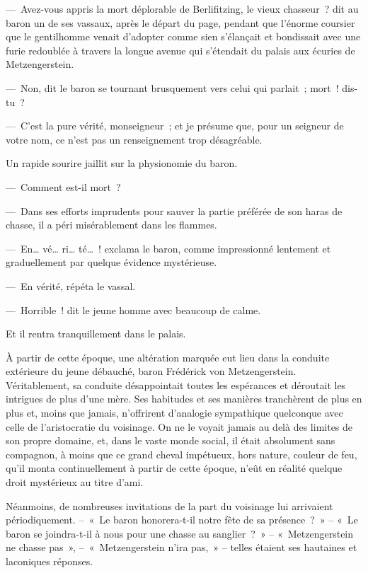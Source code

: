 \documentclass[french,twoside]{book} %
\begin{document}
— Avez-vous appris la mort déplorable de Berlifitzing, le vieux chasseur ? dit au baron un de ses vassaux, après le départ du page, pendant que l’énorme coursier que le gentilhomme venait d’adopter comme sien s’élançait et bondissait avec une furie redoublée à travers la longue avenue qui s’étendait du palais aux écuries de Metzengerstein.\par
— Non, dit le baron se tournant brusquement vers celui qui parlait ; mort ! dis-tu ?\par
— C’est la pure vérité, monseigneur ; et je présume que, pour un seigneur de votre nom, ce n’est pas un renseignement trop désagréable.\par
Un rapide sourire jaillit sur la physionomie du baron.\par
— Comment est-il mort ?\par
— Dans ses efforts imprudents pour sauver la partie préférée de son haras de chasse, il a péri misérablement dans les flammes.\par
— En… vé… ri… té… ! exclama le baron, comme impressionné lentement et graduellement par quelque évidence mystérieuse.\par
— En vérité, répéta le vassal.\par
— Horrible ! dit le jeune homme avec beaucoup de calme.\par
Et il rentra tranquillement dans le palais.\par
À partir de cette époque, une altération marquée eut lieu dans la conduite extérieure du jeune débauché, baron Frédérick von Metzengerstein. Véritablement, sa conduite désappointait toutes les espérances et déroutait les intrigues de plus d’une mère. Ses habitudes et ses manières tranchèrent de plus en plus et, moins que jamais, n’offrirent d’analogie sympathique quelconque avec celle de l’aristocratie du voisinage. On ne le voyait jamais au delà des limites de son propre domaine, et, dans le vaste monde social, il était absolument sans compagnon, à moins que ce grand cheval impétueux, hors nature, couleur de feu, qu’il monta continuellement à partir de cette époque, n’eût en réalité quelque droit mystérieux au titre d’ami.\par
Néanmoins, de nombreuses invitations de la part du voisinage lui arrivaient périodiquement. – « Le baron honorera-t-il notre fête de sa présence ? » – « Le baron se joindra-t-il à nous pour une chasse au sanglier ? » – « Metzengerstein ne chasse pas », – « Metzengerstein n’ira pas, » – telles étaient ses hautaines et laconiques réponses.\par
\end{document}
